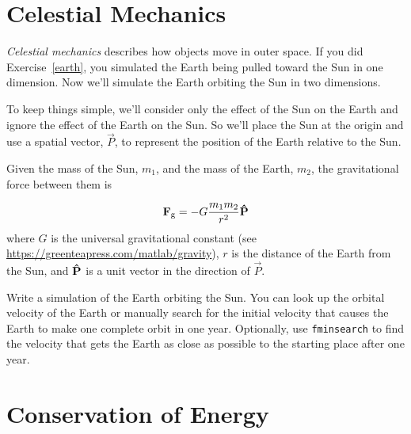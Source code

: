 \section{Celestial Mechanics}


\emph{Celestial mechanics} describes how objects move in outer space.
If you did  Exercise~\ref{earth}, you simulated the Earth being pulled toward the Sun in one dimension.  Now we'll simulate the Earth orbiting the Sun in two dimensions.


To keep things simple, we'll consider only the effect of the Sun on the Earth and ignore the effect of the Earth on the Sun.  So we'll place the Sun at the origin and use a spatial vector, $\vec{P}$, to represent the position of the Earth relative to the Sun.


Given the mass of the Sun, $m_{1}$, and the mass of the Earth, $m_{2}$, the gravitational force between them is

\begin{equation*}
\vec{F}_\mathrm{g} = -G \frac{m_1 m_2}{r^2} \uvec{P}
\end{equation*}
where $G$ is the universal gravitational constant (see \url{https://greenteapress.com/matlab/gravity}),
$r$ is the distance of the Earth from the Sun, and
$\uvec{P}$ is a unit vector in the direction of $\vec{P}$.


\begin{ex}
Write a simulation of the Earth orbiting the Sun.  You can look up the orbital velocity of the Earth or manually search for the initial velocity that causes the Earth to make one complete orbit in one year.  Optionally, use \lstinline{fminsearch} to find the velocity that gets the Earth as close as possible to the starting place after one year.


\end{ex}


\section{Conservation of Energy}

